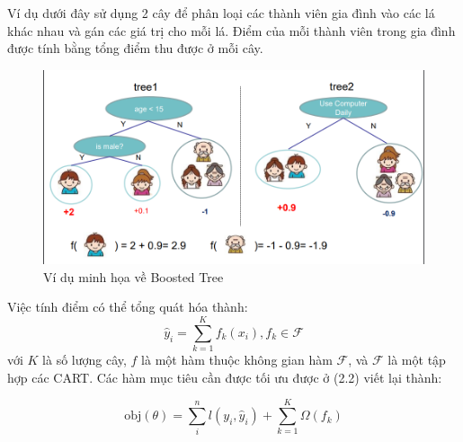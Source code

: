 \indent Ví dụ dưới đây sử dụng 2 cây để phân loại các thành viên gia đình vào các lá khác nhau và gán các giá trị cho mỗi lá. Điểm của mỗi thành viên trong gia đình được tính bằng tổng điểm thu được ở mỗi cây.
\begin{figure}[H]
    \centering
    \includegraphics[scale=0.5]{Chapter2/Figs/tree_example.PNG}
    \caption{Ví dụ minh họa về  Boosted Tree}
    \label{fig:my_label}
\end{figure}
Việc tính điểm có thể tổng quát hóa thành:
\begin{equation}
    \hat{y}_i = \sum_{k=1}^K f_k(x_i), f_k \in \mathcal{F}
\end{equation}
với $K$ là số lượng cây, $f$ là một hàm thuộc không gian hàm $\mathcal{F}$, và $\mathcal{F}$ là một tập hợp    các CART. Các hàm mục tiêu cần được tối ưu được ở (2.2) viết lại thành:

\begin{equation}
    \text{obj}(\theta) = \sum_i^n l(y_i, \hat{y}_i) + \sum_{k=1}^K \Omega(f_k)
\end{equation}
